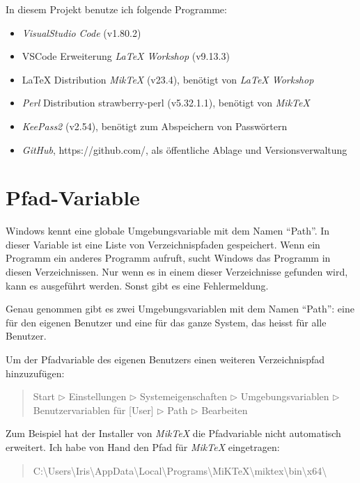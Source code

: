\documentclass[a4paper]{article} %
\begin{document}
    In diesem Projekt benutze ich folgende Programme:
    \begin{itemize}
        \item \textsl{VisualStudio Code} (v1.80.2)
        \item VSCode Erweiterung \textsl{LaTeX Workshop} (v9.13.3)
        \item LaTeX Distribution \textsl{MikTeX} (v23.4), benötigt von \textsl{LaTeX Workshop}
        \item \textsl{Perl} Distribution strawberry-perl (v5.32.1.1), benötigt von \textsl{MikTeX}
        \item \textsl{KeePass2} (v2.54), benötigt zum Abspeichern von Passwörtern
        \item \textsl{GitHub}, https://github.com/, als öffentliche Ablage und Versionsverwaltung
    \end{itemize}

    \section{Pfad-Variable} %
    Windows kennt eine globale Umgebungsvariable mit dem Namen ``Path''.
    In dieser Variable ist eine Liste von Verzeichnispfaden gespeichert.
    Wenn ein Programm ein anderes Programm aufruft, 
    sucht Windows das Programm in diesen Verzeichnissen.
    Nur wenn es in einem dieser Verzeichnisse gefunden wird,
    kann es ausgeführt werden.
    Sonst gibt es eine Fehlermeldung.

    Genau genommen gibt es zwei Umgebungsvariablen mit dem Namen ``Path'':
    eine für den eigenen Benutzer und eine für das ganze System,
    das heisst für alle Benutzer.

    Um der Pfadvariable des eigenen Benutzers einen weiteren Verzeichnispfad hinzuzufügen:
    \begin{quote}
        Start $\triangleright$ Einstellungen $\triangleright$
        Systemeigenschaften $\triangleright$ Umgebungsvariablen
        $\triangleright$ Benutzervariablen für [User] $\triangleright$
        Path $\triangleright$ Bearbeiten
    \end{quote}

    Zum Beispiel hat der Installer von \textsl{MikTeX} die Pfadvariable
    nicht automatisch erweitert.
    Ich habe von Hand den Pfad für \textsl{MikTeX} eingetragen:
    \begin{quote}
        C:\textbackslash Users\textbackslash Iris\textbackslash AppData\textbackslash Local\textbackslash Programs\textbackslash MiKTeX\textbackslash miktex\textbackslash bin\textbackslash x64\textbackslash 
    \end{quote}
\end{document}
